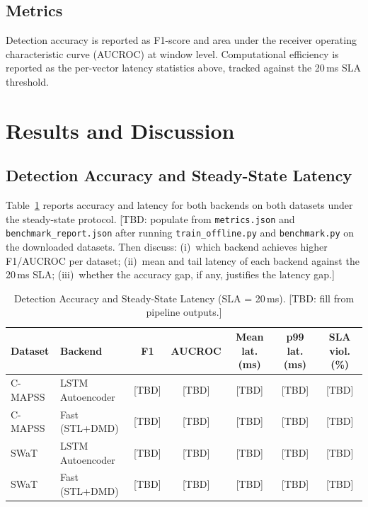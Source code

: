 \subsection{Metrics}
Detection accuracy is reported as F1-score and area under the receiver
operating characteristic curve (AUCROC) at window level. Computational
efficiency is reported as the per-vector latency statistics above, tracked
against the 20\,ms SLA threshold.

\section{Results and Discussion}

\subsection{Detection Accuracy and Steady-State Latency}
Table~\ref{tab:steady} reports accuracy and latency for both backends on
both datasets under the steady-state protocol.
[TBD: populate from \texttt{metrics.json} and
\texttt{benchmark\_report.json} after running \texttt{train\_offline.py}
and \texttt{benchmark.py} on the downloaded datasets. Then discuss:
(i)~which backend achieves higher F1/AUCROC per dataset; (ii)~mean and
tail latency of each backend against the 20\,ms SLA; (iii)~whether the
accuracy gap, if any, justifies the latency gap.]

\begin{table}[!t]
\caption{Detection Accuracy and Steady-State Latency (SLA = 20\,ms).
[TBD: fill from pipeline outputs.]}
\label{tab:steady}
\centering
\begin{tabular}{llccccc}
\hline
Dataset & Backend & F1 & AUCROC & Mean lat. (ms) & p99 lat. (ms) & SLA viol. (\%) \\
\hline
C-MAPSS & LSTM Autoencoder      & [TBD] & [TBD] & [TBD] & [TBD] & [TBD] \\
C-MAPSS & Fast (STL+DMD)        & [TBD] & [TBD] & [TBD] & [TBD] & [TBD] \\
SWaT    & LSTM Autoencoder      & [TBD] & [TBD] & [TBD] & [TBD] & [TBD] \\
SWaT    & Fast (STL+DMD)        & [TBD] & [TBD] & [TBD] & [TBD] & [TBD] \\
\hline
\end{tabular}
\end{table}

